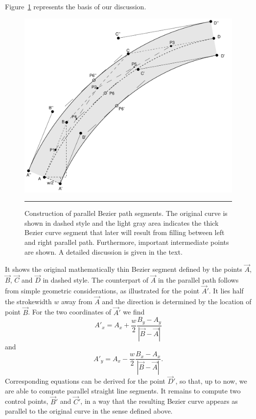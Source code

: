 Figure~\ref{figure:stroking3} represents the basis of our discussion.
\begin{figure}[t]
\centerline{\includegraphics[scale=0.7]{t1dump/parallelpath_sk}}
\hrule\vskip3mm\small
\caption{\label{figure:stroking3}Construction of parallel Bezier path
  segments. The original curve is shown in dashed style and the light gray
  area indicates the thick Bezier curve segment that later will result from
  filling between left and right parallel path. Furthermore, important
  intermediate points are shown. A detailed discussion is given in the text.} 
\end{figure}
It shows the original mathematically thin Bezier segment defined by the points
$\vec{A}$, $\vec{B}$, $\vec{C}$ and $\vec{D}$ in dashed style. The
counterpart of $\vec{A}$ in the parallel path follows from simple geometric
considerations, as illustrated for the point $\vec{A}'$. It lies half the
strokewidth $w$ away from $\vec{A}$ and the direction is determined by the
location of point $\vec{B}$. For the two coordinates of $\vec{A}'$ we find 
\begin{equation}
  \label{eq:eq1}
  A'_x = A_x + \frac{w}{2}\frac{B_y - A_y}{|\vec{B} - \vec{A}|}
\end{equation}
and
\begin{equation}
  \label{eq:eq2}
  A'_y = A_x - \frac{w}{2}\frac{B_x - A_x}{|\vec{B} - \vec{A}|}.
\end{equation}
Corresponding equations can be derived for the point $\vec{D}'$, so that, up to now, we
are able to compute parallel straight line segments. It remains to compute two
control points, $\vec{B}'$ and $\vec{C}'$, in a way that the resulting Bezier
curve appears as parallel to the original curve in the sense defined above. 

